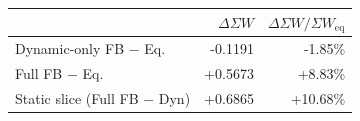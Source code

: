 \begin{tabular}{lrr}
\toprule
                       & $\Delta \Sigma W$ & $\Delta \Sigma W / \Sigma W_{\text{eq}}$ \\
\midrule
Dynamic-only FB $-$ Eq.   & -0.1191 & -1.85\% \\
Full FB $-$ Eq.           & +0.5673 & +8.83\% \\
\midrule
Static slice (Full FB $-$ Dyn) & +0.6865 & +10.68\% \\
\bottomrule
\end{tabular}
